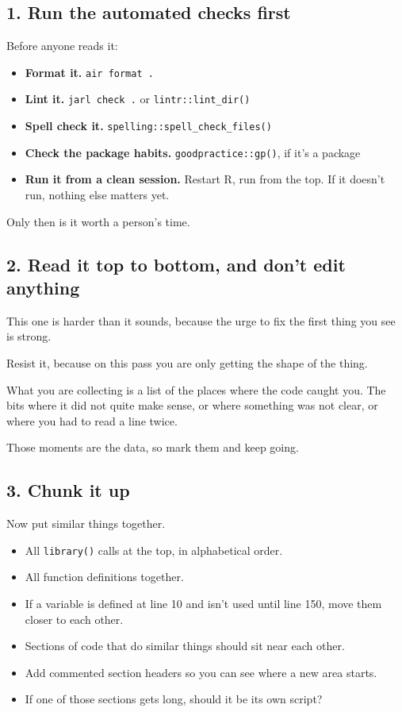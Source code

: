 \documentclass[
  letterpaper,
  justified,
  a4paper]{tufte-book}
\providecommand{\tightlist}{%
  \setlength{\itemsep}{0pt}\setlength{\parskip}{0pt}}
\providecommand{\tightlist}{%
  \setlength{\itemsep}{0pt}\setlength{\parskip}{0pt}}
\begin{document}
\subsection{1. Run the automated checks
first}\label{run-the-automated-checks-first}

Before anyone reads it:

\begin{itemize}
\tightlist
\item
  \textbf{Format it.} \texttt{air\ format\ .}
\item
  \textbf{Lint it.} \texttt{jarl\ check\ .} or
  \texttt{lintr::lint\_dir()}
\item
  \textbf{Spell check it.} \texttt{spelling::spell\_check\_files()}
\item
  \textbf{Check the package habits.} \texttt{goodpractice::gp()}, if
  it's a package
\item
  \textbf{Run it from a clean session.} Restart R, run from the top. If
  it doesn't run, nothing else matters yet.
\end{itemize}

Only then is it worth a person's time.

\subsection{2. Read it top to bottom, and don't edit
anything}\label{read-it-top-to-bottom-and-dont-edit-anything}

This one is harder than it sounds, because the urge to fix the first
thing you see is strong.

Resist it, because on this pass you are only getting the shape of the
thing.

What you are collecting is a list of the places where the code caught
you. The bits where it did not quite make sense, or where something was
not clear, or where you had to read a line twice.

Those moments are the data, so mark them and keep going.

\subsection{3. Chunk it up}\label{chunk-it-up}

Now put similar things together.

\begin{itemize}
\tightlist
\item
  All \texttt{library()} calls at the top, in alphabetical order.
\item
  All function definitions together.
\item
  If a variable is defined at line 10 and isn't used until line 150,
  move them closer to each other.
\item
  Sections of code that do similar things should sit near each other.
\item
  Add commented section headers so you can see where a new area starts.
\item
  If one of those sections gets long, should it be its own script?
\end{itemize}
\end{document}
